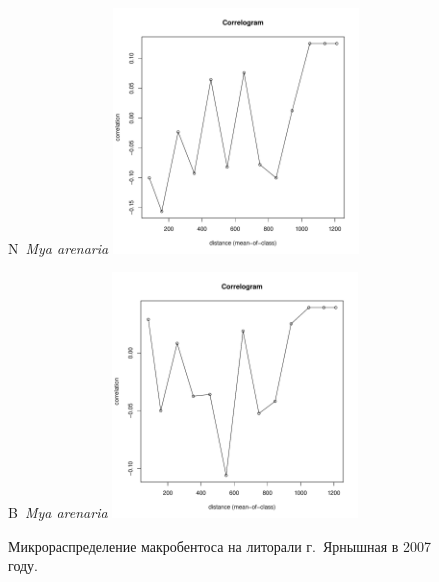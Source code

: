 \documentclass[12pt, a4paper]{disser}
\begin{document}
\begin{figure}[h]
	\begin{minipage}[b]{.46\linewidth}
	\begin{center}
	{\small N~{\it Mya arenaria}}
		\includegraphics[width=65mm]{../Barenc_Sea/distribution_Moran/Yarnyshnaya07_moran_N_Mya_arenaria_.pdf}
	\end{center}
	\end{minipage}
%
	\hfil %
%
	\begin{minipage}[b]{.46\linewidth}
	\begin{center}
	{\small B~{\it Mya arenaria}}
		\includegraphics[width=65mm]{../Barenc_Sea/distribution_Moran/Yarnyshnaya07_moran_B_Mya_arenaria_.pdf}
	\end{center}
	\end{minipage}



	\caption{Микрораспределение макробентоса на литорали  г.~Ярнышная в 2007 году.}
	\label{ris:moransI_Yarn07_1}
	\end{figure}
\end{document}
